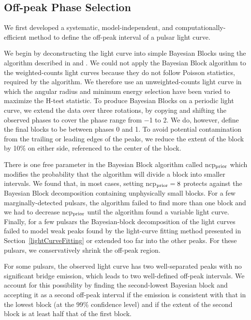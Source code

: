 \subsection{Off-peak Phase Selection}
\label{peak_definition}

We first developed a systematic, model-independent, and computationally-efficient method 
to define the off-peak interval of a pulsar light curve.

We begin by deconstructing the light curve 
into simple Bayesian Blocks using the algorithm described in
\citet{Jackson_Bayesian_Blocks_2003} and \citet{Scargle2013}.  
We could not apply the Bayesian Block algorithm to the weighted-counts
light curves because they do not follow Poisson statistics, required
by the algorithm.
We therefore use an unweighted-counts light curve in which the angular radius and minimum energy selection have been varied to maximize the H-test statistic.  To produce Bayesian Blocks on a periodic light curve,
we extend the data over three rotations, by copying and shifting the
observed phases to cover the phase range from $-$1 to 2.  We do, however,
define the final blocks to be between phases 0 and 1.  
To avoid potential contamination from the trailing or leading edges of
the peaks, we reduce the extent of the block by 10\% on either side,
referenced to the center of the block.

There is one free parameter in the Bayesian Block algorithm called
ncp$\rm _{prior}$ which modifies the probability that the
algorithm will divide a block into smaller intervals.
We found that, in most cases, setting ncp$\rm _{prior}=8$ protects against
the Bayesian Block decomposition containing unphysically small blocks.
For a few marginally-detected pulsars, the algorithm failed 
to find more than one block and we had to decrease ncp$\rm _{prior}$ until the
algorithm found a variable light curve. Finally, for a few pulsars the 
Bayesian-block decomposition of the light curves failed to model 
weak peaks found by the light-curve fitting method
presented in Section~\ref{lightCurveFitting} or extended
too far into the other peaks. For these pulsars,
we conservatively shrink the off-peak region.

For some pulsars, the observed light curve has two well-separated peaks
with no significant bridge emission, which leads to two well-defined
off-peak intervals.  We account for this possibility by finding the second-lowest 
Bayesian block and accepting it as a second off-peak interval if
the emission is consistent with that in the lowest block (at the 99\%
confidence level) and if the extent of the second block is at least half
that of the first block.

